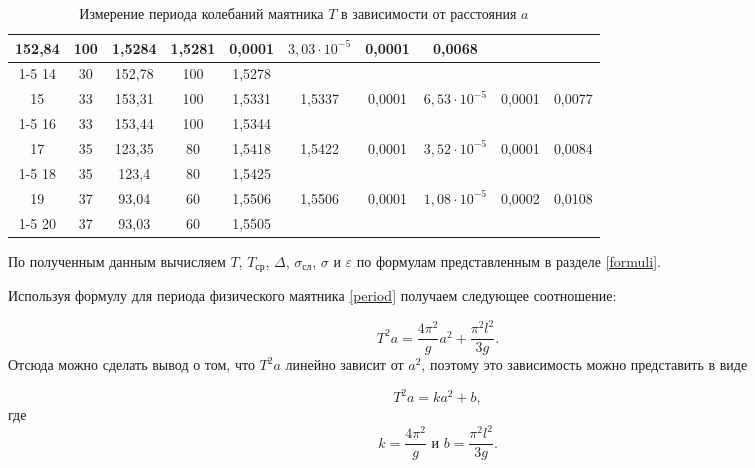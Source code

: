 \documentclass[a4paper,12pt]{article} %
\begin{document}
\begin{table}[h!!]
\begin{center}
\begin{tabular}{|c|c|c|c|c|c|c|c|c|c|}
		152,84 &
		100 &
		1,5284 &
		\multirow{2}{*}{1,5281} &
		\multirow{2}{*}{0,0001} &
		\multirow{2}{*}{$3,03 \cdot 10^{-5}$} &
		\multirow{2}{*}{0,0001} &
		\multirow{2}{*}{0,0068} \\ \cline{1-5}
		14 &
		30 &
		152,78 &
		100 &
		1,5278 &
		&
		&
		&
		&
		\\ \hline
		15 &
		33 &
		153,31 &
		100 &
		1,5331 &
		\multirow{2}{*}{1,5337} &
		\multirow{2}{*}{0,0001} &
		\multirow{2}{*}{$6,53 \cdot 10^{-5}$} &
		\multirow{2}{*}{0,0001} &
		\multirow{2}{*}{0,0077} \\ \cline{1-5}
		16 &
		33 &
		153,44 &
		100 &
		1,5344 &
		&
		&
		&
		&
		\\ \hline
		17 &
		35 &
		123,35 &
		80 &
		1,5418 &
		\multirow{2}{*}{1,5422} &
		\multirow{2}{*}{0,0001} &
		\multirow{2}{*}{$3,52 \cdot 10^{-5}$} &
		\multirow{2}{*}{0,0001} &
		\multirow{2}{*}{0,0084} \\ \cline{1-5}
		18 &
		35 &
		123,4 &
		80 &
		1,5425 &
		&
		&
		&
		&
		\\ \hline
		19 &
		37 &
		93,04 &
		60 &
		1,5506 &
		\multirow{2}{*}{1,5506} &
		\multirow{2}{*}{0,0001} &
		\multirow{2}{*}{$1,08 \cdot 10^{-5}$} &
		\multirow{2}{*}{0,0002} &
		\multirow{2}{*}{0,0108} \\ \cline{1-5}
		20 &
		37 &
		93,03 &
		60 &
		1,5505 &
		&
		&
		&
		&
		\\ \hline
	\end{tabular}
	\end{center}
\caption{Измерение периода колебаний маятника $ T $ в зависимости от расстояния $ a $}
\label{tab2}
\end{table}

По полученным данным вычисляем $ T $, $ T_\text{ср} $, $ \Delta $, $ \sigma_\text{сл}$, $ \sigma $ и $ \varepsilon $ по формулам представленным в разделе \ref{formuli}.

Используя формулу для периода физического маятника \eqref{period} получаем следующее соотношение:

\begin{equation}
T^2a=\frac{4\pi^2}{g}a^2+\frac{\pi^2l^2}{3g}.
\end{equation}
Отсюда можно сделать вывод о том, что $ T^2a $ линейно зависит от $ a^2 $, поэтому это зависимость можно представить в виде

\begin{equation}
T^2a=ka^2+b,
\end{equation}
где
\begin{equation}\label{koef}
k=\frac{4\pi^2}{g}  \text{ и }  b = \frac{\pi^2l^2}{3g}.
\end{equation}
\end{document}
